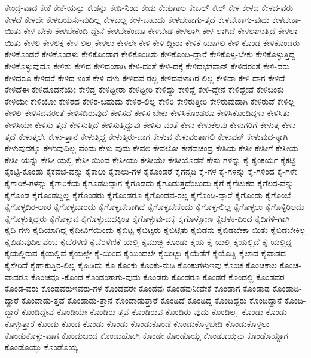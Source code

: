 {ಕೇಂದ್ರ-ವಾದ
ಕೇಕೆ
ಕೇಕೆ-ಯನ್ನು
ಕೇಡನ್ನು
ಕೇಡಿ-ನಿಂದ
ಕೇಡು
ಕೇಡುಗಾಲ
ಕೇಬಲ್
ಕೇರ್
ಕೇಳ
ಕೇಳದ
ಕೇಳದ-ವರು
ಕೇಳದೆ
ಕೇಳದೇ
ಕೇಳಬಯಸು-ವುದಿಲ್ಲ
ಕೇಳಬಲ್ಲ
ಕೇಳ-ಬಹುದು
ಕೇಳಬೇಕಾಗು-ತ್ತದೆ
ಕೇಳಬೇಕಾಗು-ವುದು
ಕೇಳಬೇಕಾ-ಯಿತು
ಕೇಳ-ಬೇಕು
ಕೇಳಬೇಕೆಂದಿ-ದ್ದೇನೆ
ಕೇಳಬೇಕೆಂದೂ
ಕೇಳಬೇಡ
ಕೇಳಲಾಗಿ
ಕೇಳ-ಲಾಗಿದೆ
ಕೇಳಲಾಗುತ್ತಿದೆ
ಕೇಳಲಾ-ಯಿತು
ಕೇಳಲಿ
ಕೇಳಲಿಕ್ಕೆ
ಕೇಳ-ಲಿಲ್ಲ
ಕೇಳಲು
ಕೇಳಲೇ
ಕೇಳಿ
ಕೇಳಿ-ದ್ದೀರಾ
ಕೇಳಿಕೆ-ಯಾಗಲಿ
ಕೇಳಿ-ಕೊಂಡ
ಕೇಳಿಕೊಂಡರು
ಕೇಳಿಕೊಂಡರೆ
ಕೇಳಿಕೊಂಡಳು
ಕೇಳಿಕೊಂಡಾಗ
ಕೇಳಿಕೊಂಡಿತು
ಕೇಳಿಕೊಂಡಿ-ದ್ದಾರೆ
ಕೇಳಿಕೊಳ್ಳ-ಬೇಕು
ಕೇಳಿಕೊಳ್ಳುತ್ತಿದ್ದ
ಕೇಳಿಕೊಳ್ಳುವುದೂ
ಕೇಳಿತು
ಕೇಳಿದ
ಕೇಳಿದಂತಾಗಿ
ಕೇಳಿ-ದಂತೆ
ಕೇಳಿ-ದಕ್ಕೆ
ಕೇಳಿದಭಗವಾನ್
ಕೇಳಿದರಂತೆ
ಕೇಳಿ-ದರು
ಕೇಳಿದರೂ
ಕೇಳಿದರೆ
ಕೇಳಿದ-ಳಂತೆ
ಕೇಳಿ-ದಳು
ಕೇಳಿದವ-ರಲ್ಲ
ಕೇಳಿದವಳಾಗಿರ-ಲಿಲ್ಲ
ಕೇಳಿದಾ
ಕೇಳಿ-ದಾಗ
ಕೇಳಿದೆ
ಕೇಳಿದೆಈ
ಕೇಳಿದೊಡನೆಯೇ
ಕೇಳಿದ್ದ
ಕೇಳಿದ್ದೀರಾ
ಕೇಳಿದ್ದೀರಿ
ಕೇಳಿದ್ದು
ಕೇಳಿದ್ದೆ
ಕೇಳಿ-ದ್ದೇನೆ
ಕೇಳಿದ್ದೇವೆ
ಕೇಳಿಬಂತು
ಕೇಳಿಯೇ
ಕೇಳಿಯೋ
ಕೇಳಿರದ
ಕೇಳಿರ-ಬಹುದು
ಕೇಳಿರ-ಲಿಲ್ಲ
ಕೇಳಿರಿ
ಕೇಳಿರುತ್ತೀರಿ
ಕೇಳಿರುವುದಾಗಿ
ಕೇಳಿರುವೆ
ಕೇಳಿಲ್ಲ
ಕೇಳಿಲ್ಲಿ
ಕೇಳಿಸದವರಂತೆ
ಕೇಳಿಸದಿರುವುದೆ
ಕೇಳಿಸದೆ
ಕೇಳಿಸ-ಬೇಕು
ಕೇಳಿಸಿಕೊಂಡರೂ
ಕೇಳಿಸಿಕೊಂಡಿದ್ದಳು
ಕೇಳಿಸಿತು
ಕೇಳಿಸಿಯೇ
ಕೇಳಿಸು-ತ್ತದೆ
ಕೇಳಿಸುತ್ತಿದೆ
ಕೇಳಿಸುತ್ತಿದ್ದುವು
ಕೇಳಿಸು-ವಂತೆ
ಕೇಳು
ಕೇಳುಕೆಲವು
ಕೇಳುಗರಿಗೆ
ಕೇಳುತ್ತ
ಕೇಳು-ತ್ತದೆ
ಕೇಳುತ್ತಲೇ
ಕೇಳು-ತ್ತಾನೆ
ಕೇಳುತ್ತಿದ್ದ
ಕೇಳುತ್ತಿರು-ವಾಗ
ಕೇಳುವ
ಕೇಳುವಂತಾಗಲಿ
ಕೇಳುವನ್
ಕೇಳುವುದ-ಕ್ಕಾಗಿ
ಕೇಳುವುದಕ್ಕೂ
ಕೇಳುವುದಿಲ್ಲ-ವೆಂದು
ಕೇಳು-ವುದು
ಕೇವಲ
ಕೇವಲೋ
ಕೇಶವಚಂದ್ರ
ಕೇಸಿಯ
ಕೇಸೀ
ಕೇಸೀಗೆ
ಕೇಸೀಯ
ಕೇಸೀ-ಯನ್ನು
ಕೇಸೀ-ಯಲ್ಲಿ
ಕೇಸೀ-ಯಿಂದ
ಕೇಸೀಯು
ಕೇಸೀಯೇ
ಕೇಸೀಯೊಡನೆ
ಕೇಸು-ಗಳನ್ನು
ಕೈ
ಕೈಂಕರ್ಯ
ಕೈಕಟ್ಟಿ
ಕೈಕಟ್ಟಿ-ಕೊಂಡು
ಕೈಕವಚ-ವನ್ನು
ಕೈಕಾಲು
ಕೈಕಾಲು-ಗಳ
ಕೈಕೊಂಡರೆ
ಕೈಗನ್ನಡಿ
ಕೈ-ಗಳ
ಕೈ-ಗಳನ್ನು
ಕೈ-ಗಳಿಂದ
ಕೈ-ಗಳೇ
ಕೈಗಾರಿಕೆ-ಗಳನ್ನು
ಕೈಗಾರಿಕೆಯ
ಕೈಗೂಡದಿದ್ದಾಗ
ಕೈಗೂಡದು
ಕೈಗೂಡುತ್ತದೆಂಬುದು
ಕೈಗೆ
ಕೈಗೆಟುಕದ
ಕೈಗೆಲಸ-ವನ್ನು
ಕೈಗೊಂಡ
ಕೈಗೊಂಡದ್ದಿಲ್ಲ
ಕೈಗೊಂಡರು
ಕೈಗೊಂಡರೂ
ಕೈಗೊಂಡವ-ರಲ್ಲ
ಕೈಗೊಂಡಿ-ದ್ದಾರೆ
ಕೈಗೊಂಡು
ಕೈಗೊಂಬೆ
ಕೈಗೊಳ್ಳದಿರ-ಲಾರ
ಕೈಗೊಳ್ಳಬಾರದು
ಕೈಗೊಳ್ಳಬೇಕಾಗಿದೆ
ಕೈಗೊಳ್ಳಬೇಕೆಂದು
ಕೈಗೊಳ್ಳ-ಲಿಲ್ಲ
ಕೈಗೊಳ್ಳಲು
ಕೈಗೊಳ್ಳಿರಿಅದು
ಕೈಗೊಳ್ಳುತ್ತಿದ್ದರು
ಕೈಗೊಳ್ಳುವ
ಕೈಗೊಳ್ಳುವುದಕ್ಕಿಂತ
ಕೈಗೊಳ್ಳುವು-ದಕ್ಕೆ
ಕೈಗೊಳ್ಳೋಣ
ಕೈಚಳಕ-ದಿಂದ
ಕೈದಿಗಳಿ-ಗಾಗಿ
ಕೈದಿ-ಗಳು
ಕೈದಿಯಾಗಿದ್ದ
ಕೈದೀವಿಗೆಯಿಂದು
ಕೈಬಿಟ್ಟ
ಕೈಬಿಟ್ಟರು
ಕೈಬಿಟ್ಟಿತು
ಕೈಬಿಡನು
ಕೈಬಿಡಬೇಕಾ-ಯಿತು
ಕೈಬಿಡಬೇಕಿಲ್ಲ
ಕೈಬಿಡುವುದಿಲ್ಲವೆಂಬ
ಕೈಬೆರಳಣಿ
ಕೈಬೆರಳೆಣಿಕೆ-ಯಲ್ಲಿ
ಕೈಮುಚ್ಚಿ-ಕೊಂಡು
ಕೈಯ
ಕೈ-ಯಲ್ಲಿ
ಕೈಯಲ್ಲಿದೆ
ಕೈ-ಯಲ್ಲಿದ್ದ
ಕೈಯಲ್ಲಿರುವ
ಕೈಯಲ್ಲಿವೆ
ಕೈಯಲ್ಲೇ
ಕೈ-ಯಿಂದ
ಕೈಯಿಂದಲೇ
ಕೈಯಿಟ್ಟು
ಕೈಯೆಡೆಗೆ
ಕೈಯೊಡ್ಡಿ
ಕೈಲಾದ
ಕೈವಾಡದ
ಕೈಸೇರಿದೆ
ಕೈಹಾಕುತ್ತಿರ-ಲಿಲ್ಲ
ಕೈಹಿಡಿದು
ಕೊ
ಕೊಂಕು
ಕೊಂಕು-ನುಡಿ
ಕೊಂಕುಗಳುಇವು
ಕೊಂಚ
ಕೊಂಚಕಾಲ
ಕೊಂಚ-ವಾದರೂ
ಕೊಂಚವೂ
-ಕೊಂಡ
ಕೊಂಡಂತಾಗು-ವುದು
ಕೊಂಡರು
ಕೊಂಡರೂ
ಕೊಂಡರೆ
ಕೊಂಡಲ್ಲಿ
ಕೊಂಡವರ
ಕೊಂಡ-ವರು
ಕೊಂಡವರುಇವರು-ಗಳ
ಕೊಂಡವರೇ
ಕೊಂಡವು
ಕೊಂಡವುನೀವೇಕೆ
ಕೊಂಡಾಗ
ಕೊಂಡಾಡ
ಕೊಂಡಾಡಿ-ದ್ದಾರೆ
ಕೊಂಡಾಡು-ತ್ತವೆ
ಕೊಂಡಾಡು-ತ್ತಾನೆ
ಕೊಂಡಾಡುತ್ತಾರೆ
ಕೊಂಡಿದೆ
ಕೊಂಡಿದ್ದ
ಕೊಂಡಿದ್ದರು
ಕೊಂಡಿದ್ದಾನೆ
ಕೊಂಡಿ-ದ್ದಾರೆ
ಕೊಂಡಿದ್ದೇವೆ
ಕೊಂಡಿಯೇ
ಕೊಂಡಿರು-ತ್ತವೆ
ಕೊಂಡಿರುವ
ಕೊಂಡಿರು-ವುದು
ಕೊಂಡಿಲ್ಲ
-ಕೊಂಡು
ಕೊಂಡು-ಕೊಳ್ಳುತ್ತಾರೆ
ಕೊಂಡು-ಕೊಂಡ
ಕೊಂಡು-ಕೊಂಡು
ಕೊಂಡುಕೊಂಡೆ
ಕೊಂಡುಕೊಳ್ಳಬೇಡಿ
ಕೊಂಡುಕೊಳ್ಳಲು
ಕೊಂಡುಕೊಳ್ಳು-ವಾಗ
ಕೊಂಡುಬಂದ
ಕೊಂಡುಹೋಗಿ
ಕೊಂಡೇ
ಕೊಂಡೊಯ್ದ
ಕೊಂಡೊಯ್ದವು
ಕೊಂಡೊಯ್ದಾಗ
ಕೊಂಡೊಯ್ದು
ಕೊಂಡೊಯ್ಯ
}
